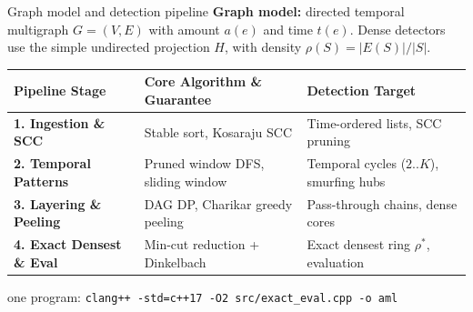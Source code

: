 \documentclass[aspectratio=169,11pt]{beamer}
\begin{document}
\begin{frame}{Graph model and detection pipeline}
\textbf{Graph model:} directed temporal multigraph $G = (V, E)$ with amount $a(e)$ and time $t(e)$. Dense detectors use the simple undirected projection $H$, with density $\rho(S) = |E(S)| / |S|$.

\vspace{0.15cm}
\centering
{\scriptsize
\setlength{\tabcolsep}{3.5pt}
\begin{tabular}{@{}lll@{}}
\toprule
\textbf{Pipeline Stage} & \textbf{Core Algorithm \& Guarantee} & \textbf{Detection Target} \\
\midrule
\textbf{1. Ingestion \& SCC} & Stable sort, Kosaraju SCC & Time-ordered lists, SCC pruning \\
\textbf{2. Temporal Patterns} & Pruned window DFS, sliding window & Temporal cycles ($2..K$), smurfing hubs \\
\textbf{3. Layering \& Peeling} & DAG DP, Charikar greedy peeling & Pass-through chains, dense cores \\
\textbf{4. Exact Densest \& Eval} & Min-cut reduction + Dinkelbach & Exact densest ring $\rho^*$, evaluation \\
\bottomrule
\end{tabular}
}

\vspace{0.3cm}

\vspace{0.15cm}
{\footnotesize one program: \texttt{clang++ -std=c++17 -O2 src/exact\_eval.cpp -o aml}}
\end{frame}
\end{document}
